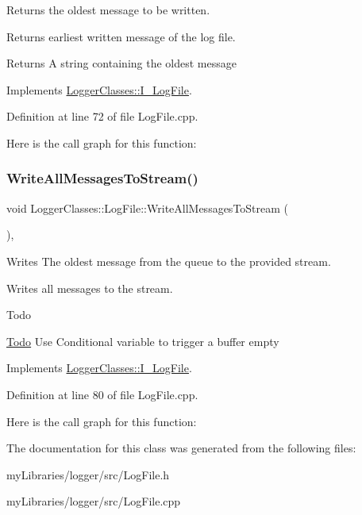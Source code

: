 Returns the oldest message to be written. 

Returns earliest written message of the log file.

\begin{DoxyReturn}{Returns}
A string containing the oldest message 
\end{DoxyReturn}


Implements \mbox{\hyperlink{classLoggerClasses_1_1I__LogFile_abe417f462ced8b890878233d7c2a860e}{Logger\+Classes\+::\+I\+\_\+\+Log\+File}}.



Definition at line 72 of file Log\+File.\+cpp.

Here is the call graph for this function\+:
\mbox{\label{classLoggerClasses_1_1LogFile_a0b87592b5bbe3803b9c09e21351e4288}} 
\subsubsection{\texorpdfstring{WriteAllMessagesToStream()}{WriteAllMessagesToStream()}}
{\footnotesize\ttfamily void Logger\+Classes\+::\+Log\+File\+::\+Write\+All\+Messages\+To\+Stream (\begin{DoxyParamCaption}{ }\end{DoxyParamCaption})\hspace{0.3cm}{\ttfamily [override]}, {\ttfamily [virtual]}}



Writes The oldest message from the queue to the provided stream. 

Writes all messages to the stream.

\begin{DoxyRefDesc}{Todo}
\item[\mbox{\hyperlink{todo__todo000007}{Todo}}]Use Conditional variable to trigger a buffer empty \end{DoxyRefDesc}


Implements \mbox{\hyperlink{classLoggerClasses_1_1I__LogFile_a91d67fd8de7bffe69bec95bcb56e7fc4}{Logger\+Classes\+::\+I\+\_\+\+Log\+File}}.



Definition at line 80 of file Log\+File.\+cpp.

Here is the call graph for this function\+:


The documentation for this class was generated from the following files\+:\begin{DoxyCompactItemize}
\item 
my\+Libraries/logger/src/Log\+File.\+h\item 
my\+Libraries/logger/src/Log\+File.\+cpp\end{DoxyCompactItemize}
